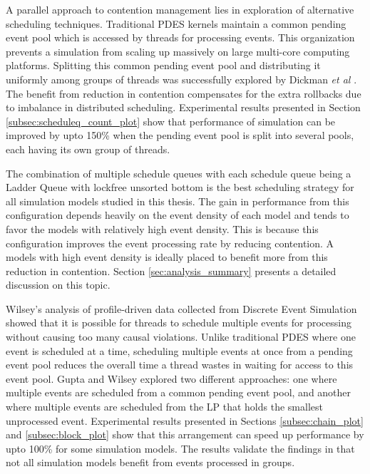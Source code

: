 \documentclass[11pt]{book}
\begin{document}
A parallel approach to contention management lies in exploration of alternative scheduling techniques.
Traditional PDES kernels maintain a common pending event pool which is accessed by threads for processing
events.  This organization prevents a simulation from scaling up massively on large multi-core computing
platforms.  Splitting this common pending event pool and distributing it uniformly among groups of threads was
successfully explored by Dickman \emph{et al} \cite{dickman-13}.  The benefit from reduction in contention
compensates for the extra rollbacks due to imbalance in distributed scheduling.  Experimental results
presented in Section \ref{subsec:scheduleq_count_plot} show that performance of simulation can be improved by
upto 150\% when the pending event pool is split into several pools, each having its own group of threads.

The combination of multiple schedule queues with each schedule queue being a Ladder Queue with lockfree
unsorted bottom is the best scheduling strategy for all simulation models studied in this thesis.  The gain in
performance from this configuration depends heavily on the event density of each model and tends to favor the
models with relatively high event density.  This is because this configuration improves the event processing
rate by reducing contention.  A models with high event density is ideally placed to benefit more from this
reduction in contention.  Section \ref{sec:analysis_summary} presents a detailed discussion on this topic.

Wilsey's \cite{wilsey-16} analysis of profile-driven data collected from Discrete Event Simulation showed that
it is possible for threads to schedule multiple events for processing without causing too many causal
violations.  Unlike traditional PDES where one event is scheduled at a time, scheduling multiple events at
once from a pending event pool reduces the overall time a thread wastes in waiting for access to this event
pool.  Gupta and Wilsey \cite{gupta-14} explored two different approaches: one where multiple events are
scheduled from a common pending event pool, and another where multiple events are scheduled from the LP that
holds the smallest unprocessed event.  Experimental results presented in Sections \ref{subsec:chain_plot} and
\ref{subsec:block_plot} show that this arrangement can speed up performance by upto 100\% for some simulation
models.  The results validate the findings in \cite{wilsey-16} that not all simulation models benefit from
events processed in groups.
\end{document}
